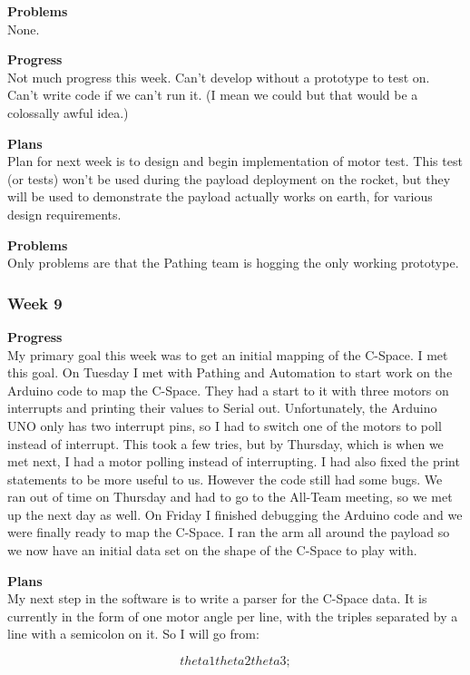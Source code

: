 \textbf{Problems} \\ 
None.

\textbf{Progress} \\
Not much progress this week. Can't develop without a prototype to test on. 
Can't write code if we can't run it. (I mean we could but that would be a 
colossally awful idea.)

\textbf{Plans} \\
Plan for next week is to design and begin implementation of motor test. This 
test (or tests) won't be used during the payload deployment on the rocket, but 
they will be used to demonstrate the payload actually works on earth, for 
various design requirements.

\textbf{Problems} \\
Only problems are that the Pathing team is hogging the only working prototype.

\subsubsection{Week 9}
\textbf{Progress} \\ 
My primary goal this week was to get an initial mapping of the C-Space. I met this goal. On Tuesday I met with Pathing and Automation to start work on the Arduino code to map the C-Space. They had a start to it with three motors on interrupts and printing their values to Serial out. Unfortunately, the Arduino UNO only has two interrupt pins, so I had to switch one of the motors to poll instead of interrupt. This took a few tries, but by Thursday, which is when we met next, I had a motor polling instead of interrupting. I had also fixed the print statements to be more useful to us. However the code still had some bugs. We ran out of time on Thursday and had to go to the All-Team meeting, so we met up the next day as well. On Friday I finished debugging the Arduino code and we were finally ready to map the C-Space. I ran the arm all around the payload so we now have an initial data set on the shape of the C-Space to play with.

\textbf{Plans} \\ 
My next step in the software is to write a parser for the C-Space data. It is currently in the form of one motor angle per line, with the triples separated by a line with a semicolon on it. So I will go from:

\[ theta1 theta2 theta3 ;\]

